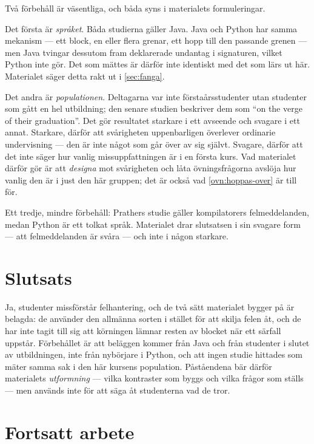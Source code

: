 Två förbehåll är väsentliga, och båda syns i materialets formuleringar.

Det första är \emph{språket}.  Båda studierna gäller Java.  Java och
Python har samma mekanism --- ett block, en eller flera grenar, ett hopp
till den passande grenen --- men Java tvingar dessutom fram deklarerade
undantag i signaturen, vilket Python inte gör.  Det som mättes är därför
inte identiskt med det som lärs ut här.  Materialet säger detta rakt ut i
\cref{sec:fanga}.

Det andra är \emph{populationen}.  Deltagarna var inte förstaårsstudenter
utan studenter som gått en hel utbildning; den senare studien beskriver
dem som \enquote{on the verge of their graduation}.  Det gör resultatet
starkare i ett avseende och svagare i ett annat.  Starkare, därför att
svårigheten uppenbarligen överlever ordinarie undervisning --- den är
inte något som går över av sig självt.  Svagare, därför att det inte
säger hur vanlig missuppfattningen är i en första kurs.  Vad
materialet därför gör är att \emph{designa} mot svårigheten och låta
övningsfrågorna avslöja hur vanlig den är i just den här gruppen; det är
också vad \cref{ovn:hoppas-over} är till för.

Ett tredje, mindre förbehåll: Prathers studie gäller kompilatorers
felmeddelanden, medan Python är ett tolkat språk.  Materialet drar
slutsatsen i sin svagare form --- att felmeddelanden är svåra --- och
inte i någon starkare.

\section{Slutsats}
\label{sec:nyb-slutsats}

Ja, studenter missförstår felhantering, och de två sätt materialet bygger
på är belagda: de använder den allmänna sorten i stället för att skilja
felen åt, och de har inte tagit till sig att körningen lämnar resten av
blocket när ett särfall uppstår.  Förbehållet är att beläggen kommer från
Java och från studenter i slutet av utbildningen, inte från nybörjare i
Python, och att ingen studie hittades som mäter samma sak i den här
kursens population.  Påståendena bär därför materialets \emph{utformning}
--- vilka kontraster som byggs och vilka frågor som ställs --- men
används inte för att säga åt studenterna vad de tror.

\section{Fortsatt arbete}
\label{sec:nyb-fortsatt}

